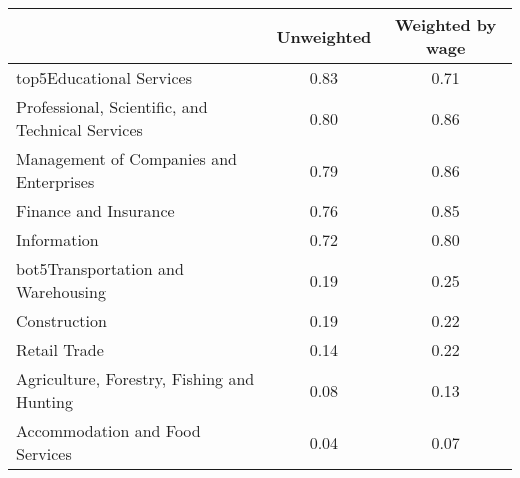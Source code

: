 \begin{tabular}{lcc} \toprule
& Unweighted & Weighted by wage\\
\midrule
top5Educational Services&0.83&0.71\\
Professional, Scientific, and Technical Services&0.80&0.86\\
Management of Companies and Enterprises&0.79&0.86\\
Finance and Insurance&0.76&0.85\\
Information&0.72&0.80\\
bot5Transportation and Warehousing&0.19&0.25\\
Construction&0.19&0.22\\
Retail Trade&0.14&0.22\\
Agriculture, Forestry, Fishing and Hunting&0.08&0.13\\
Accommodation and Food Services&0.04&0.07\\
\bottomrule \end{tabular}
